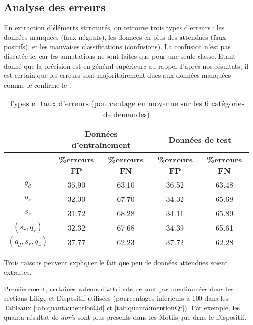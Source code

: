 \subsection{Analyse des erreurs}

En extraction d'éléments structurés, on retrouve trois types d'erreurs \citep{yang2016jointEntityEvt}: les données manquées (faux négatifs), les données en plus des attendues (faux positifs), et les mauvaises classifications (confusions). La confusion n'est pas discutée ici car les annotations ne sont faites que pour une seule classe. %
Etant donné que la précision est en général supérieure au rappel d'après nos résultats, il est certain que les erreurs sont majoritairement dues aux données manquées comme le confirme le . 

\begin{table}[!htb]
	\centering\small
	\begin{tabular}{|c|c|c|c|c|}
		\hline
		 & \multicolumn{2}{|c|}{Données d'entraînement} & \multicolumn{2}{|c|}{Données de test} \\ \hline
		& \textbf{\%erreurs FP} & \textbf{\%erreurs FN} & \textbf{\%erreurs FP} & \textbf{\%erreurs FN} \\ \hline
		$q_d$ & 36.90 & 63.10 & 36.52 & 63.48 \\ \hline
		$q_r$ & 32.30 & 67.70 & 34.32 & 65.68 \\ \hline
		$s_r$ & 31.72 & 68.28 & 34.11 & 65.89 \\ \hline
		$(s_r, q_r)$ & 32.32 & 67.68 & 34.39 & 65.61 \\ \hline
		$(q_d,s_r, q_r)$ & 37.77 & 62.23 & 37.72 & 62.28 \\ \hline
	\end{tabular}
\caption{Types et taux d'erreurs (pourcentage en moyenne sur les 6 catégories de demandes)} \label{tab:quanta:types_erreurs}
\end{table}

Trois raisons peuvent expliquer le fait que peu de données attendues soient extraites. 

Premièrement, certaines valeurs d'attributs ne sont pas mentionnées dans les sections Litige et Dispositif utilisées (pourcentages inférieurs à 100 dans les Tableaux \ref{tab:quanta:mentionQd} et \ref{tab:quanta:mentionQr}). Par exemple, les quanta résultat de \textit{doris} sont plus présents dans les Motifs que dans le Dispositif.

